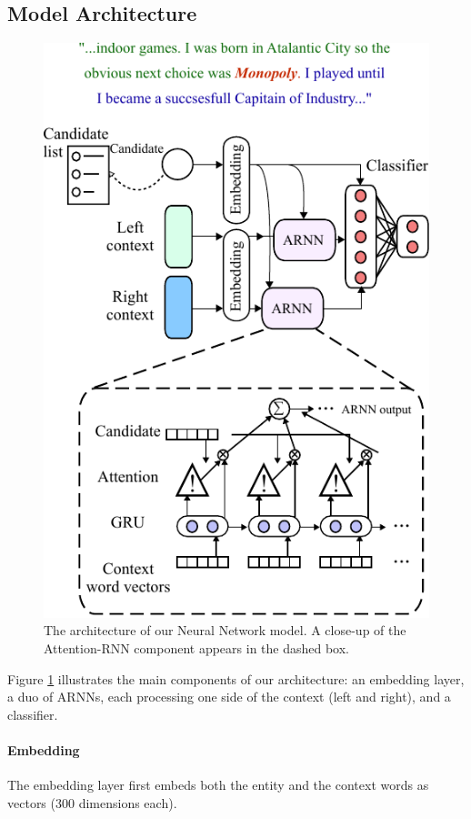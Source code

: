 \documentclass[11pt,a4paper]{article}
\begin{document}
	\subsection{Model Architecture}
	
	\begin{figure}[t]
		\centering
		\includegraphics[scale=0.78]{diagrams/model_color_v8.pdf}
		\caption{The architecture of our Neural Network model. A close-up of the Attention-RNN component appears in the dashed box.}
		\label{fig:arnn}
	\end{figure}	
	
	Figure \ref{fig:arnn} illustrates the main components of our architecture: an embedding layer, a duo of ARNNs, each processing one side of the context (left and right), %
	and a classifier. 
	
	
	\paragraph{Embedding}
	The embedding layer first embeds both the entity and the context words as vectors (300 dimensions each).
	
\end{document}

